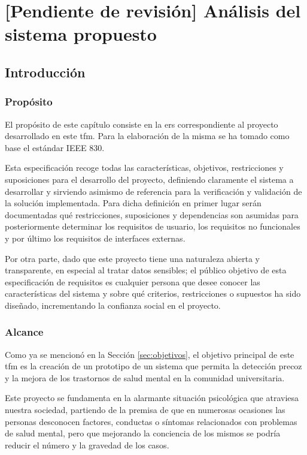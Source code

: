 \chapter{[Pendiente de revisión] Análisis del sistema propuesto}
\label{chapter:analisis}


\section{Introducción}

    \subsection{Propósito}
        El propósito de este capítulo consiste en la \gls{ers} correspondiente al proyecto desarrollado en este \gls{tfm}. Para la elaboración de la misma se ha tomado como base el estándar IEEE 830.

        Esta especificación recoge todas las características, objetivos, restricciones y suposiciones para el desarrollo del proyecto, definiendo claramente el sistema a desarrollar y sirviendo asimismo de referencia para la verificación y validación de la solución implementada. Para dicha definición en primer lugar serán documentadas qué restricciones, suposiciones y dependencias son asumidas para posteriormente determinar los requisitos de usuario, los requisitos no funcionales y por último los requisitos de interfaces externas.

        Por otra parte, dado que este proyecto tiene una naturaleza abierta y transparente, en especial al tratar datos sensibles; el público objetivo de esta especificación de requisitos es cualquier persona que desee conocer las características del sistema y sobre qué criterios, restricciones o supuestos ha sido diseñado, incrementando la confianza social en el proyecto.
        
    \subsection{Alcance}
        \label{req:intro:alcance}
        Como ya se mencionó en la Sección \ref{sec:objetivos}, el objetivo principal de este \gls{tfm} es la creación de un prototipo de un sistema que permita la detección precoz y la mejora de los trastornos de salud mental en la comunidad universitaria. 

        Este proyecto se fundamenta en la alarmante situación psicológica que atraviesa nuestra sociedad, partiendo de la premisa de que en numerosas ocasiones las personas desconocen factores, conductas o síntomas relacionados con problemas de salud mental, pero que mejorando la conciencia de los mismos se podría reducir el número y la gravedad de los casos.

